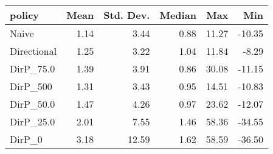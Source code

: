 \begin{tabular}{lrrrrr}
\toprule
     policy &  Mean &  Std. Dev. &  Median &   Max &    Min \\
\midrule
      Naive &  1.14 &       3.44 &    0.88 & 11.27 & -10.35 \\
Directional &  1.25 &       3.22 &    1.04 & 11.84 &  -8.29 \\
  DirP\_75.0 &  1.39 &       3.91 &    0.86 & 30.08 & -11.15 \\
   DirP\_500 &  1.31 &       3.43 &    0.95 & 14.51 & -10.83 \\
  DirP\_50.0 &  1.47 &       4.26 &    0.97 & 23.62 & -12.07 \\
  DirP\_25.0 &  2.01 &       7.55 &    1.46 & 58.36 & -34.55 \\
     DirP\_0 &  3.18 &      12.59 &    1.62 & 58.59 & -36.50 \\
\bottomrule
\end{tabular}
